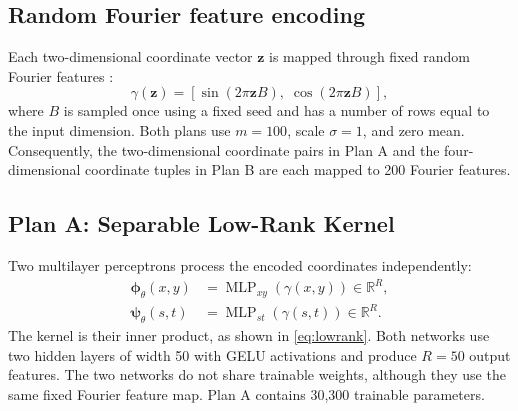 \documentclass[11pt,a4paper]{article}
\newcommand{\R}{\mathbb{R}}
\begin{document}
\subsection{Random Fourier feature encoding}

Each two-dimensional coordinate vector $\bm z$ is mapped through fixed random Fourier features \cite{tancik2020fourier}:
\begin{equation}
  \gamma(\bm z)=
  \left[
  \sin(2\pi\bm z B),\;
  \cos(2\pi\bm z B)
  \right],
  \label{eq:rff}
\end{equation}
where $B$ is sampled once using a fixed seed and has a number of rows equal to the input dimension. Both plans use $m=100$, scale $\sigma=1$, and zero mean. Consequently, the two-dimensional coordinate pairs in Plan A and the four-dimensional coordinate tuples in Plan B are each mapped to 200 Fourier features.

\subsection{Plan A: Separable Low-Rank Kernel}

Two multilayer perceptrons process the encoded coordinates independently:
\begin{align}
  \bm\phi_{\theta}(x,y)&=\operatorname{MLP}_{xy}(\gamma(x,y))\in\R^R,\\
  \bm\psi_{\theta}(s,t)&=\operatorname{MLP}_{st}(\gamma(s,t))\in\R^R.
\end{align}
The kernel is their inner product, as shown in \cref{eq:lowrank}. Both networks use two hidden layers of width 50 with GELU activations and produce $R=50$ output features. The two networks do not share trainable weights, although they use the same fixed Fourier feature map. Plan A contains 30,300 trainable parameters.
\end{document}
